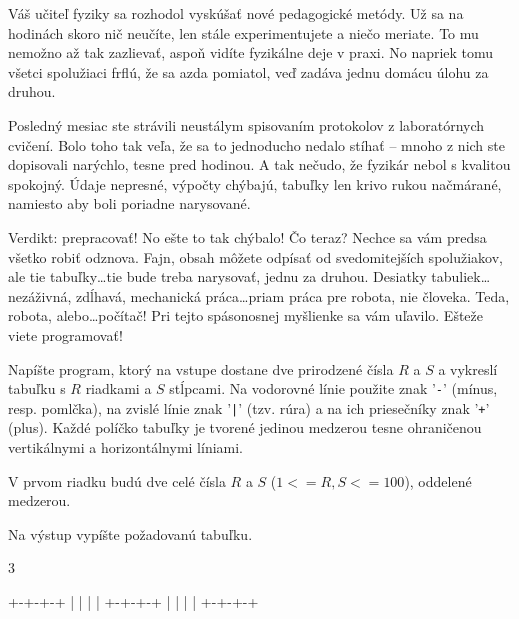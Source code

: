 




Váš učiteľ fyziky sa rozhodol vyskúšať nové pedagogické metódy. Už sa na
hodinách skoro nič neučíte, len stále experimentujete a niečo meriate. To mu
nemožno až tak zazlievať, aspoň vidíte fyzikálne deje v praxi. No napriek tomu
všetci spolužiaci frflú, že sa azda pomiatol, veď zadáva jednu domácu úlohu za
druhou.

Posledný mesiac ste strávili neustálym spisovaním protokolov z laboratórnych
cvičení. Bolo toho tak veľa, že sa to jednoducho nedalo stíhať -- mnoho z nich
ste dopisovali narýchlo, tesne pred hodinou. A tak nečudo, že fyzikár nebol s
kvalitou spokojný. Údaje nepresné, výpočty chýbajú, tabuľky len krivo rukou
načmárané, namiesto aby boli poriadne narysované.

Verdikt: prepracovať! No ešte to tak chýbalo! Čo teraz? Nechce sa vám predsa
všetko robiť odznova. Fajn, obsah môžete odpísať od svedomitejších spolužiakov,
ale tie tabuľky\dots tie bude treba narysovať, jednu za druhou. Desiatky
tabuliek\dots nezáživná, zdĺhavá, mechanická práca\dots priam práca pre robota,
nie človeka.  Teda, robota, alebo\dots počítač! Pri tejto spásonosnej myšlienke
sa vám uľavilo.  Ešteže viete programovať!

Napíšte program, ktorý na vstupe dostane dve prirodzené čísla $R$ a $S$ a
vykreslí tabuľku s $R$ riadkami a $S$ stĺpcami. Na vodorovné línie použite znak
'{\tt -}' (mínus, resp. pomlčka), na zvislé línie znak '{\tt |}' (tzv. rúra) a
na ich priesečníky znak '{\tt +}' (plus). Každé políčko tabuľky je tvorené
jedinou medzerou tesne ohraničenou vertikálnymi a horizontálnymi líniami.


V prvom riadku budú dve celé čísla $R$ a $S$ ($1 <= R, S <= 100$), oddelené 
medzerou.


Na výstup vypíšte požadovanú tabuľku.

 3

\vystup
+-+-+-+
| | | |
+-+-+-+
| | | |
+-+-+-+

\koniec


